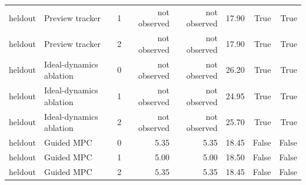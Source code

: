 \begin{table}[t]
{\begin{tabular}{llrrrrrr}
heldout & Preview tracker & 1 & not observed & not observed & 17.90 & True & True \\
heldout & Preview tracker & 2 & not observed & not observed & 17.90 & True & True \\
heldout & Ideal-dynamics ablation & 0 & not observed & not observed & 26.20 & True & True \\
heldout & Ideal-dynamics ablation & 1 & not observed & not observed & 24.95 & True & True \\
heldout & Ideal-dynamics ablation & 2 & not observed & not observed & 25.70 & True & True \\
heldout & Guided MPC & 0 & 5.35 & 5.35 & 18.45 & False & False \\
heldout & Guided MPC & 1 & 5.00 & 5.00 & 18.50 & False & False \\
heldout & Guided MPC & 2 & 5.35 & 5.35 & 18.45 & False & False \\
\bottomrule
\end{tabular}}
\end{table}
